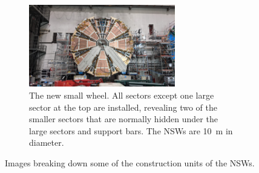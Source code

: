 \begin{figure}
\smallskip

\begin{subfigure}{\textwidth}
  \centering
  \includegraphics[width=0.7\textwidth]{figures/nsw_2021-05-27_landscape.jpeg}
  \caption{The new small wheel. All sectors except one large sector at the top are installed, revealing two of the smaller sectors that are normally hidden under the large sectors and support bars. The NSWs are \SI{10}{m} in diameter. }
  \label{fig:nsw}
  \end{subfigure}
\caption{Images breaking down some of the construction units of the NSWs.}
\label{fig:nsw_breakdown}
\end{figure}
\newpage
\restoregeometry





